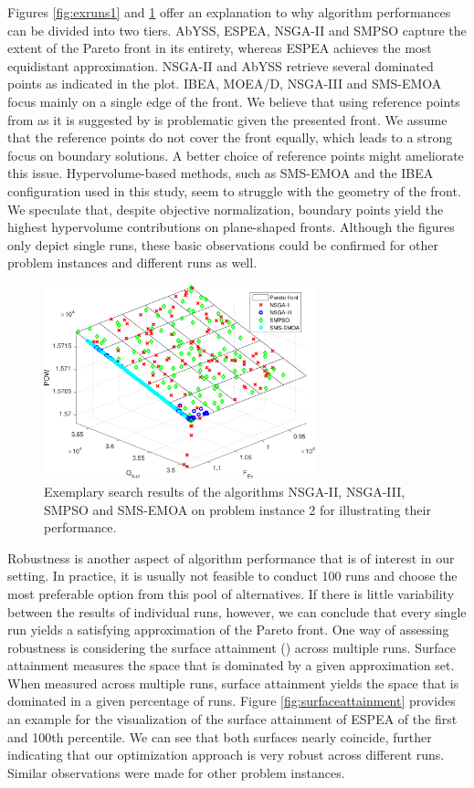Figures \ref{fig:exruns1} and \ref{fig:exruns2} offer an explanation to why algorithm performances can be divided into two tiers. AbYSS, ESPEA, NSGA-II and SMPSO capture the extent of the Pareto front in its entirety, whereas ESPEA achieves the most equidistant approximation. NSGA-II and AbYSS retrieve several dominated points as indicated in the plot. IBEA, MOEA/D, NSGA-III and SMS-EMOA focus mainly on a single edge of the front. We believe that using reference points from \cite{nbi} as it is suggested by \cite{moead2009,nsga3part1} is problematic given the presented front. We assume that the reference points do not cover the front equally, which leads to a strong focus on boundary solutions. A better choice of reference points might ameliorate this issue. Hypervolume-based methods, such as SMS-EMOA and the IBEA configuration used in this study, seem to struggle with the geometry of the front. We speculate that, despite objective normalization, boundary points yield the highest hypervolume contributions on plane-shaped fronts. Although the figures only depict single runs, these basic observations could be confirmed for other problem instances and different runs as well.

\begin{figure}
\centering
\includegraphics[width=0.7\textwidth]{figures/example2_cropped.pdf}
\caption{Exemplary search results of the algorithms NSGA-II, NSGA-III, SMPSO and SMS-EMOA on problem instance 2 for illustrating their performance.}
\label{fig:exruns2}
\end{figure}

Robustness is another aspect of algorithm performance that is of interest in our setting. In practice, it is usually not feasible to conduct 100 runs and choose the most preferable option from this pool of alternatives. If there is little variability between the results of individual runs, however, we can conclude that every single run yields a satisfying approximation of the Pareto front. One way of assessing robustness is considering the surface attainment (\cite{fonseca1996performance}) across multiple runs. Surface attainment measures the space that is dominated by a given approximation set. When measured across multiple runs, surface attainment yields the space that is dominated in a given percentage of runs. Figure \ref{fig:surfaceattainment} provides an example for the visualization of the surface attainment of ESPEA of the first and 100th percentile. We can see that both surfaces nearly coincide, further indicating that our optimization approach is very robust across different runs. Similar observations were made for other problem instances.

